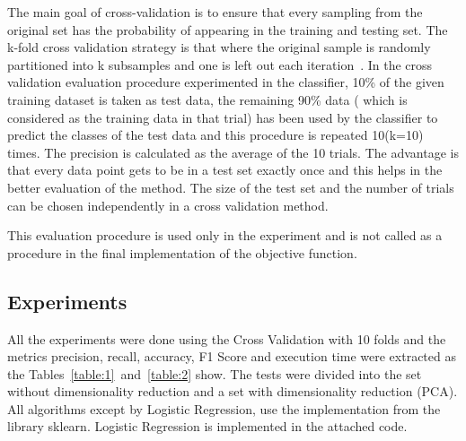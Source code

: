 \documentclass[letterpaper,10pt]{article}
\theoremstyle{mytheor}
\begin{document}
The main goal of cross-validation is to ensure that every sampling from the original set has the probability of appearing in the training and testing set. The k-fold cross validation strategy is that where the original sample is randomly partitioned into k subsamples and one is left out each iteration~\cite{kohavi1995study}. In the cross validation evaluation procedure experimented in the classifier, 10\% of the given training dataset is taken as test data, the remaining 90\% data ( which is considered as the training data in that trial) has been used by the classifier to predict the classes of the test data and this procedure is repeated 10(k=10) times. The precision is calculated as the average of the 10 trials. The advantage is that every data point gets to be in a test set exactly once and this helps in the better evaluation of the method. The size of the test set and the number of trials can be chosen independently in a cross validation method.

This evaluation procedure is used only in the experiment and is not called as a procedure in the final implementation of the objective function. 

\subsection{Experiments}

All the experiments were done using the Cross Validation with 10 folds and the metrics precision, recall, accuracy, F1 Score and execution time were extracted as the Tables~\ref{table:1}~and~\ref{table:2} show. The tests were divided into the set without dimensionality reduction and a set with dimensionality reduction (PCA). All algorithms except by Logistic Regression, use the implementation from the library sklearn. Logistic Regression is implemented in the attached code.
\end{document}

